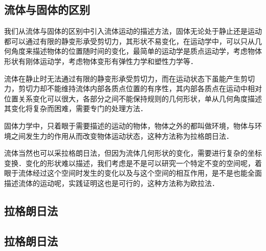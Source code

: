 \subsection{流体与固体的区别}
我们从流体与固体的区别中引入流体运动的描述方法，固体无论处于静止还是运动都可以通过有限的静变形承受剪切力，其形状不易变化，在运动学中，可以只从几何角度来描述物体的位置随时间的变化，最简单的运动学是质点运动学，考虑物体形状有刚体运动学，考虑物体变形有弹性力学和塑性力学等．

流体在静止时无法通过有限的静变形承受剪切力，而在运动状态下虽能产生剪切力，剪切力却不能维持流体内部各质点位置的有序性，其内部各质点在运动中相对位置关系变化可以很大，各部分之间不能保持规则的几何形状，单从几何角度描述其变化将复杂而困难，需要专门的处理方法．

固体力学中，只着眼于需要描述的运动的物体，物体之外的都叫做环境，物体与环境之间发生力的作用从而改变物体运动状态，这种方法称为拉格朗日法．

流体当然也可以采拉格朗日法，但因为流体几何形状的变化，需要进行复杂的坐标变换．变化的形状难以描述，我们考虑是不是可以研究一个特定不变的空间呢，着眼于流体经过这个空间时发生的变化以及与这个空间的相互作用，是不是也能全面描述流体的运动呢，实践证明这也是可行的，这种方法称为欧拉法．

\subsection{拉格朗日法}

\subsection{拉格朗日法}